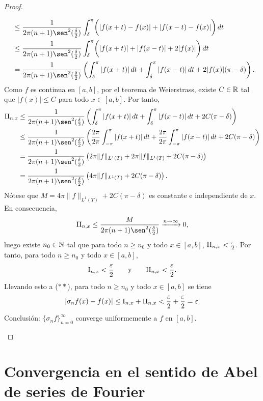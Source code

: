 \documentclass[a4paper, 11pt, oneside]{report}
\begin{document}
\begin{proof}
\begin{enumerate}
\begin{align*}
      &\leq \frac{1}{2\pi(n+1)\sen^2(\frac{\delta}{2})} \int_\delta^\pi \biggl(|f(x+t)-f(x)|+|f(x-t)-f(x)|\biggr) \, dt \\
      &\leq \frac{1}{2\pi(n+1)\sen^2(\frac{\delta}{2})} \int_\delta^\pi \biggl(|f(x+t)|+|f(x-t)|+2|f(x)|\biggr) \, dt \\\
      &= \frac{1}{2\pi(n+1)\sen^2(\frac{\delta}{2})}\left( \int_\delta^\pi |f(x+t)| \, dt + \int_\delta^\pi |f(x-t)| \, dt + 2|f(x)|(\pi-\delta)\right).
    \end{align*}
    Como $f$ es continua en $[a,b]$, por el teorema de Weierstrass, existe $C \in \mathbb R$ tal que $|f(x)| \leq C$ para todo $x \in [a,b]$. Por tanto, 
    \begin{align*}
      \textup{II}_{n,x} &\leq \frac{1}{2\pi(n+1)\sen^2(\frac{\delta}{2})}\left( \int_\delta^\pi |f(x+t)| \, dt + \int_\delta^\pi |f(x-t)| \, dt + 2C(\pi-\delta)\right) \\
      &\leq \frac{1}{2\pi(n+1)\sen^2(\frac{\delta}{2})} \left(\frac{2\pi}{2\pi}\int_{-\pi}^\pi |f(x+t)| \, dt + \frac{2\pi}{2\pi}\int_{-\pi}^\pi |f(x-t)| \, dt + 2C(\pi-\delta)\right) \\
      &= \frac{1}{2\pi(n+1)\sen^2(\frac{\delta}{2})} \left(2\pi \|f\|_{L^1(T)} + 2\pi \|f\|_{L^1(T)} + 2C(\pi-\delta)\right) \\
      &= \frac{1}{2\pi(n+1)\sen^2(\frac{\delta}{2})} \left(4\pi \|f\|_{L^1(T)} + 2C(\pi-\delta)\right).
    \end{align*}
    Nótese que $M = 4\pi \|f\|_{L^1(T)} + 2C(\pi-\delta)$ es constante e independiente de $x$. En consecuencia,
    \[\textup{II}_{n,x} \leq \frac{M}{2\pi(n+1)\sen^2(\frac{\delta}{2})} \xrightarrow{n \to \infty} 0,\]
    luego existe $n_0 \in \mathbb N$ tal que para todo $n \geq n_0$ y todo $x \in [a,b]$, $\textup{II}_{n,x} < \frac{\varepsilon}{2}$. Por tanto, para todo $n \geq n_0$ y todo $x \in [a,b]$,
    \[\textup{I}_{n,x} < \frac{\varepsilon}{2} \qquad \textup{y} \qquad \textup{II}_{n,x} < \frac{\varepsilon}{2}.\]
    Llevando esto a ($\ast\ast$), para todo $n \geq n_0$ y todo $x \in [a,b]$ se tiene
    \[|\sigma_nf(x)-f(x)| \leq \textup{I}_{n,x} + \textup{II}_{n,x} < \frac{\varepsilon}{2}+\frac{\varepsilon}{2} = \varepsilon.\]
    Conclusión: $\{\sigma_nf\}_{n=0}^\infty$ converge uniformemente a $f$ en $[a,b]$. \qedhere
  \end{enumerate}
\end{proof}


\section{Convergencia en el sentido de Abel de series de Fourier}
\end{document}
